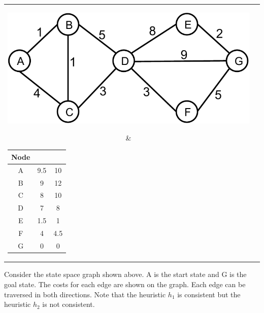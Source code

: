 \begin{center}
\begin{tabular}{cc}
\parbox[c]{10cm}{\includegraphics[width =0.6\linewidth]{figs/search_graph.pdf}}
&
\begin{tabular}[h]{|c|c|c|}
\hline
Node &$h_1$ 	&	$h_2$ \\
\hline
A 	& 	9.5 	&	10 	\\
B 	&	9	&	12	\\
C 	&	8	&	10	\\
D 	&	7	&	8	\\
E 	&	1.5	&	1	\\
F 	&	4	&	4.5	\\
G 	&	0	&	0	\\
\hline 
\end{tabular}
\end{tabular}
\end{center}

Consider the state space graph shown above.  A is the start state and
G is the goal state. The costs for each edge are shown on the graph.  Each edge can
be traversed in both directions.   Note that the heuristic $h_1$ is consistent
but the heuristic $h_2$ is not consistent.  



